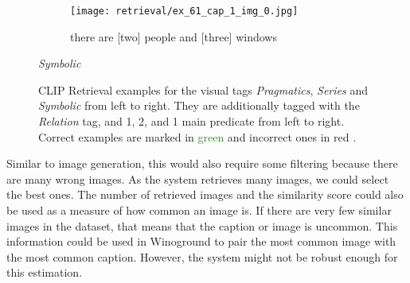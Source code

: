 \begin{figure}[ht]
\begin{minipage}{.30\textwidth}
        \begin{subfigure}{\textwidth}
        \centering
        \texttt{[image: retrieval/ex\_61\_cap\_1\_img\_0.jpg]}
        \caption{\textcolor{BrickRed}{there are [two] people and [three] windows \xmark}}
        \end{subfigure}%
        \caption*{\textit{Symbolic}}
    \end{minipage}
    \caption{CLIP Retrieval examples for the visual tags \textit{Pragmatics}, \textit{Series} and \textit{Symbolic} from left to right. They are additionally tagged with the \textit{Relation} tag, and 1, 2, and 1 main predicate from left to right.  Correct examples are marked in \textcolor{ForestGreen}{green \cmark} and incorrect ones in \textcolor{BrickRed}{red \xmark}.}
    \label{fig:retrieval-examples-visual}
\end{figure}

Similar to image generation, this would also require some filtering because there are many wrong images. As the system retrieves many images, we could select the best ones. The number of retrieved images and the similarity score could also be used as a measure of how common an image is. If there are very few similar images in the dataset, that means that the caption or image is uncommon. This information could be used in Winoground to pair the most common image with the most common caption. However, the system might not be robust enough for this estimation.